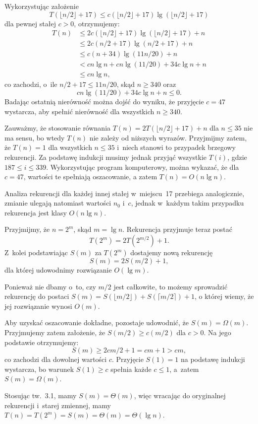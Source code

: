 \exercise %
Wykorzystując założenie
\[
	T(\lfloor n/2\rfloor+17) \le c(\lfloor n/2\rfloor+17)\lg(\lfloor n/2\rfloor+17)
\]
dla pewnej stałej $c>0$, otrzymujemy:
\begin{align*}
	T(n) &\le 2c(\lfloor n/2\rfloor+17)\lg(\lfloor n/2\rfloor+17)+n \\
	&\le 2c(n/2+17)\lg(n/2+17)+n \\
	&\le c(n+34)\lg(11n/20)+n \\
	&< cn\lg n+cn\lg(11/20)+34c\lg n+n \\
	&\le cn\lg n,
\end{align*}
co zachodzi, o~ile $n/2+17\le 11n/20$, skąd $n\ge340$ oraz
\[
	cn\lg(11/20)+34c\lg n+n \le 0.
\]
Badając ostatnią nierówność można dojść do wyniku, że przyjęcie $c=47$ wystarcza, aby spełnić nierówność dla wszystkich $n\ge340$.

Zauważmy, że stosowanie równania $T(n)=2T(\lfloor n/2\rfloor+17)+n$ dla $n\le35$ nie ma sensu, bo wtedy $T(n)$ nie zależy od niższych wyrazów. Przyjmijmy zatem, że $T(n)=1$ dla wszystkich $n\le35$ i~niech stanowi to przypadek brzegowy rekurencji. Za podstawę indukcji musimy jednak przyjąć wszystkie $T(i)$, gdzie $187\le i\le339$. Wykorzystując program komputerowy, można wykazać, że dla $c=47$, wartości te spełniają oszacowanie, a zatem $T(n)=O(n\lg n)$.

Analiza rekurencji dla każdej innej stałej w~miejscu~17 przebiega analogicznie, zmianie ulegają natomiast wartości $n_0$ i~$c$, jednak w~każdym takim przypadku rekurencja jest klasy $O(n\lg n)$.

\exercise %
Przyjmijmy, że $n=2^m$, skąd $m=\lg n$. Rekurencja przyjmuje teraz postać
\[
	T(2^m) = 2T(2^{m/2})+1.
\]
Z~kolei podstawiając $S(m)$ za $T(2^m)$ dostajemy nową rekurencję
\[
	S(m) = 2S(m/2)+1,
\]
dla której udowodnimy rozwiązanie $O(\lg m)$.

Ponieważ nie dbamy o~to, czy $m/2$ jest całkowite, to możemy sprowadzić rekurencję do postaci $S(m)=S(\lfloor m/2\rfloor)+S(\lceil m/2\rceil)+1$, o której wiemy, że jej rozwiązanie wynosi $O(m)$.

Aby uzyskać oszacowanie dokładne, pozostaje udowodnić, że $S(m)=\Omega(m)$. Przyjmujemy zatem założenie, że $S(m/2)\ge c(m/2)$ dla $c>0$. Na jego podstawie otrzymujemy:
\[
	S(m) \ge 2cm/2+1 = cm+1 > cm,
\]
co zachodzi dla dowolnej wartości $c$. Przyjęcie $S(1)=1$ na podstawę indukcji wystarcza, bo warunek $S(1)\ge c$ spełnia każde $c\le1$, a~zatem $S(m)=\Omega(m)$.

Stosując tw.~3.1, mamy $S(m)=\Theta(m)$, więc wracając do oryginalnej rekurencji i~starej zmiennej, mamy $T(n)=T(2^m)=S(m)=\Theta(m)=\Theta(\lg n)$.

